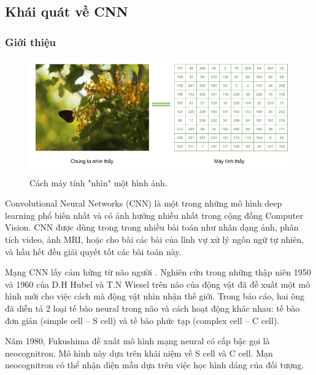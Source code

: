 \setcounter{chapter}{0}
\setcounter{section}{0}
\begin{center}
\chapter{\tenchuongi}
\end{center}

\section{Khái quát về CNN}
\subsection{Giới thiệu}
\begin{figure}[H]
	\centering
	\includegraphics[width=1\linewidth]{images/how_computer_see_image}
	\caption[Cách máy tính "nhìn" một hình.]{Cách máy tính "nhìn" một hình ảnh.}
\end{figure}

Convolutional Neural Networks (CNN) là một trong những mô hình deep learning phổ biến nhất và có ảnh hưởng nhiều nhất trong cộng đồng Computer Vision. CNN được dùng trong trong nhiều bài toán như nhân dạng ảnh, phân tích video, ảnh MRI, hoặc cho bài các bài của lĩnh vự xử lý ngôn ngữ tự nhiên, và hầu hết đều giải quyết tốt các bài toán này.

Mạng CNN lấy cảm hứng từ não người \cite{cnnhumanbrain}. Nghiên cứu trong những thập niên 1950 và 1960 của D.H Hubel và T.N Wiesel trên não của động vật đã đề xuất một mô hình mới cho việc cách mà động vật nhìn nhận thế giới. Trong báo cáo, hai ông đã diễn tả 2 loại tế bào neural trong não và cách hoạt động khác nhau: tế bào đơn giản (simple cell – S cell) và tế bào phức tạp (complex cell – C cell). 

Năm 1980, Fukushima đề xuất mô hình mạng neural có cấp bậc gọi là neocognitron. Mô hình này dựa trên khái niệm về S cell và C cell. Mạn neocognitron có thể nhận diện mẫu dựa trên việc học hình dáng của đối tượng. 

